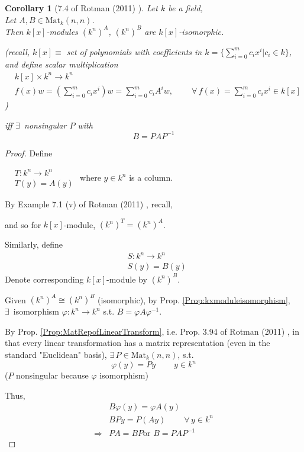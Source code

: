 \documentclass[10pt]{amsart}
\newtheorem{corollary}{Corollary}
\begin{document}
\begin{multicols*}{2}
\begin{corollary}[7.4 of Rotman (2011) \cite{JRotman2010}] 
	Let $k$ be a field, \\
	Let $A,B \in \text{Mat}_k(n,n)$.  \\
	Then $k[x]$-modules $(k^n)^A$, $(k^n)^B$ are $k[x]$-isomorphic.  
	
	(recall, $k[x]\equiv $ set of polynomials with coefficients in $k = \lbrace \sum_{i=0}^m c_ix^i | c_i \in k \rbrace$, and define scalar multiplication 
	\[
	\begin{aligned}
		& k[x] \times k^n \to k^n \\
		& f(x) w = \left( \sum_{i=0}^m c_i x^i \right) w = \sum_{i=0}^m c_iA^i w, \qquad \  \forall \, f(x) = \sum_{i=0}^m c_i x^i \in k[x] 
	\end{aligned}
	\]
	)
	
	iff $\exists \, $ nonsingular $P$ with 
	\[
	B=PAP^{-1}
	\]
	
	\end{corollary}

\begin{proof}
	Define 
	
	$\begin{aligned} & T:k^n \to k^n \\
	& T(y) = A(y) \end{aligned}$
where $y\in k^n $ is a column.  

By Example 7.1 (v) of Rotman (2011)  \cite{JRotman2010}, recall, 

and so for $k[x]$-module, $(k^n)^T = (k^n)^A$.  

Similarly, define 
\[
\begin{aligned} 
	& S: k^n \to k^n  \\
	& S(y) = B(y) 
	\end{aligned}
	\]
	Denote corresponding $k[x]$-module by $(k^n)^B$.  
	
	Given $(k^n)^A \cong (k^n)^B$ (isomorphic), by Prop. \ref{Prop:kxmoduleisomorphism}, \\
	$\exists \, $ isomorphism $\varphi :k^n \to k^n$ s.t. $B=\varphi A \varphi^{-1}$.  

By Prop. \ref{Prop:MatRepofLinearTransform}, i.e. Prop. 3.94 of Rotman (2011)  \cite{JRotman2010}, in that every linear transformation has a matrix representation (even in the standard "Euclidean" basis), $\exists \,  P \in \text{Mat}_{k}(n,n)$, s.t. 
\[
\varphi(y) = Py \qquad \  y\in k^n
\]
($P$ nonsingular because $\varphi$ isomorphism)

Thus, 
\[
\begin{aligned}
& B\varphi(y) = \varphi A(y)  \\ 
& BPy = P(Ay) \qquad \  \forall \, y \in k^n  \\
\Longrightarrow & PA = BP \text{or } B= PAP^{-1}
\end{aligned}
\]


\end{proof}
\end{multicols*}
\end{document}

